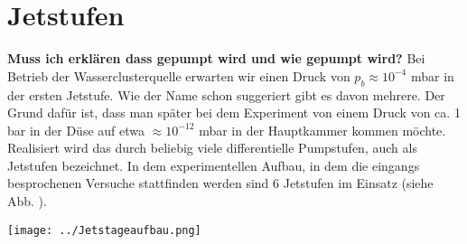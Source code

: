 \section{Jetstufen}

\textbf{Muss ich erklären dass gepumpt wird und wie gepumpt wird?}
Bei Betrieb der Wasserclusterquelle erwarten wir einen Druck von $p_b \approx 10^{-4}$ mbar in der ersten Jetstufe. Wie der Name schon suggeriert gibt es davon mehrere. Der Grund dafür ist, dass man später bei dem Experiment von einem Druck von ca. 1 bar in der Düse auf etwa $\approx 10^{-12}$ mbar in der Hauptkammer kommen möchte. Realisiert wird das durch beliebig viele differentielle Pumpstufen, auch als Jetstufen bezeichnet. In dem experimentellen Aufbau, in dem die eingangs besprochenen Versuche stattfinden werden sind 6 Jetstufen im Einsatz (siehe Abb. ).

\begin{center}
\begin{minipage}{\linewidth}
\centering
\texttt{[image: ../Jetstageaufbau.png]}%
 \label{fig:Jetstageaufbau}
\end{minipage} 
\end{center} 

